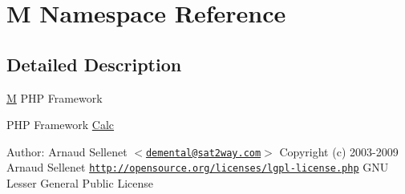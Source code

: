 \hypertarget{namespaceM}{
\section{M Namespace Reference}
\label{namespaceM}
}




\subsection{Detailed Description}
\hyperlink{namespaceM}{M} PHP Framework

PHP Framework  \hyperlink{classCalc}{Calc} \begin{Desc}
\item[Author:]Arnaud Sellenet $<$\href{mailto:demental@sat2way.com}{\tt demental@sat2way.com}$>$  Copyright (c) 2003-2009 Arnaud Sellenet  \href{http://opensource.org/licenses/lgpl-license.php}{\tt http://opensource.org/licenses/lgpl-license.php} GNU Lesser General Public License \end{Desc}
